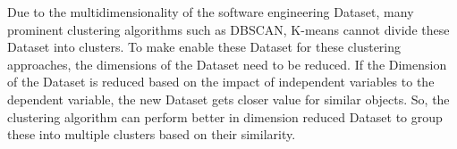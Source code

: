 \documentclass[12pt]{report}
\begin{document}

Due to the multidimensionality of the software engineering Dataset, many prominent clustering algorithms such as DBSCAN, K-means cannot divide these Dataset into clusters. To make enable these Dataset for these clustering approaches, the dimensions of the Dataset need to be reduced. If the Dimension of the Dataset is reduced based on the impact of independent variables to the dependent variable, the new Dataset gets closer value for similar objects. So, the clustering algorithm can perform better in dimension reduced Dataset to group these into multiple clusters based on their similarity. 






\end{document}
